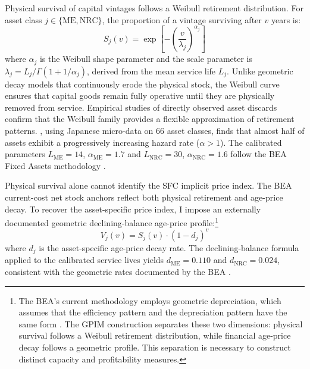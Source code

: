 Physical survival of capital vintages follows a Weibull retirement
distribution. For asset class $j \in \{\text{ME}, \text{NRC}\}$,
the proportion of a vintage surviving after $v$ years is:
\begin{equation}
	S_j(v) = \exp\!\left[ -\left( \frac{v}{\lambda_j}
	\right)^{\alpha_j} \right]
	\label{eq:41:weibull_survival}
\end{equation}
where $\alpha_j$ is the Weibull shape parameter and the scale
parameter is $\lambda_j = L_j / \Gamma(1 + 1/\alpha_j)$, derived
from the mean service life $L_j$. Unlike geometric decay models that
continuously erode the physical stock, the Weibull curve ensures
that capital goods remain fully operative until they are physically
removed from service. Empirical studies of directly observed asset
discards confirm that the Weibull family provides a flexible
approximation of retirement patterns. \citet{Nomura2005}, using
Japanese micro-data on 66 asset classes, finds that almost half of
assets exhibit a progressively increasing hazard rate
($\alpha > 1$). The calibrated parameters $L_{\text{ME}} = 14$,
$\alpha_{\text{ME}} = 1.7$ and $L_{\text{NRC}} = 30$,
$\alpha_{\text{NRC}} = 1.6$ follow the BEA Fixed Assets methodology
\citep{Fraumeni1997}.

Physical survival alone cannot identify the SFC implicit price
index. The BEA current-cost net stock anchors reflect both physical
retirement and age-price decay. To recover the asset-specific price
index, I impose an externally documented geometric declining-balance
age-price profile:\footnote{The BEA's current methodology employs
	geometric depreciation, which assumes that the efficiency pattern and
	the depreciation pattern have the same form \citep{Fraumeni1997}.
	The GPIM construction separates these two dimensions: physical
	survival follows a Weibull retirement distribution, while financial
	age-price decay follows a geometric profile. This separation is
	necessary to construct distinct capacity and profitability measures.}
\begin{equation}
	V_j(v) = S_j(v) \cdot (1 - d_j)^v
	\label{eq:41:net_value_schedule}
\end{equation}
where $d_j$ is the asset-specific age-price decay rate. The
declining-balance formula applied to the calibrated service lives
yields $d_{\text{ME}} = 0.110$ and $d_{\text{NRC}} = 0.024$,
consistent with the geometric rates documented by the BEA
\citep{Fraumeni1997}.


